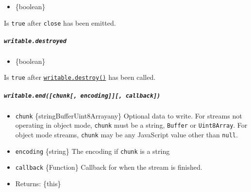 \begin{itemize}
\tightlist
\item
  \{boolean\}
\end{itemize}

Is \texttt{true} after
\texttt{\textquotesingle{}close\textquotesingle{}} has been emitted.

\subparagraph{\texorpdfstring{\texttt{writable.destroyed}}{writable.destroyed}}\label{writable.destroyed}

\begin{itemize}
\tightlist
\item
  \{boolean\}
\end{itemize}

Is \texttt{true} after
\hyperref[writabledestroyerror]{\texttt{writable.destroy()}} has been
called.

\begin{Shaded}
\begin{Highlighting}[]
\OperatorTok{=} \NormalTok{(}\NormalTok{)}\OperatorTok{;}

\OperatorTok{=}  \NormalTok{()}\OperatorTok{;}

\NormalTok{)}\OperatorTok{;} 
\NormalTok{()}\OperatorTok{;}
\NormalTok{)}\OperatorTok{;} 
\end{Highlighting}
\end{Shaded}

\subparagraph{\texorpdfstring{\texttt{writable.end({[}chunk{[},\ encoding{]}{]}{[},\ callback{]})}}{writable.end({[}chunk{[}, encoding{]}{]}{[}, callback{]})}}\label{writable.endchunk-encoding-callback}

\begin{itemize}
\tightlist
\item
  \texttt{chunk}
  \{string\textbar Buffer\textbar Uint8Array\textbar any\} Optional data
  to write. For streams not operating in object mode, \texttt{chunk}
  must be a string, \texttt{Buffer} or \texttt{Uint8Array}. For object
  mode streams, \texttt{chunk} may be any JavaScript value other than
  \texttt{null}.
\item
  \texttt{encoding} \{string\} The encoding if \texttt{chunk} is a
  string
\item
  \texttt{callback} \{Function\} Callback for when the stream is
  finished.
\item
  Returns: \{this\}
\end{itemize}

